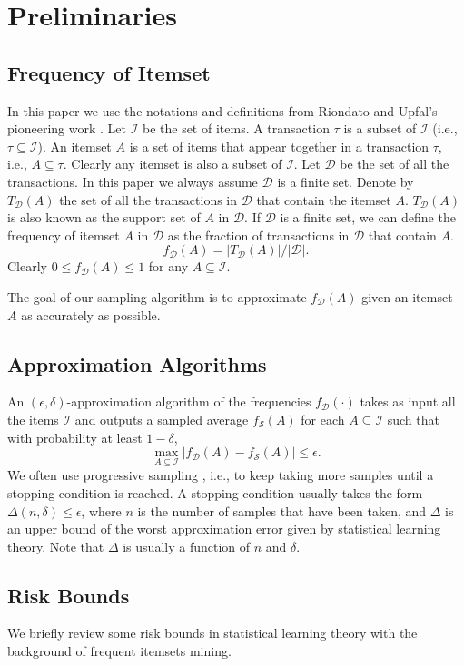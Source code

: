 \documentclass{article}
\begin{document}
\section{Preliminaries}
\subsection{Frequency of Itemset}
\newcommand{\I}{\mathcal{I}}
\newcommand{\D}{\mathcal{D}}
In this paper we use the notations and definitions from Riondato and Upfal's pioneering work \cite{RU15}. 
Let $\I$ be the set of items. A transaction $\tau$ is a subset of $\I$ (i.e., $\tau \subseteq \I$).
An itemset $A$ is a set of items that appear together in a transaction $\tau$, i.e., $A \subseteq \tau$. Clearly any itemset is also a subset of $\I$. 
Let $\D$ be the set of all the transactions. In this paper we always assume $\D$ is a finite set. Denote by $T_\D(A)$ the set of all the transactions in $\D$ that contain the itemset $A$. $T_\D(A)$ is also known as the support set of $A$ in $\D$.
If $\D$ is a finite set, we can define the frequency of itemset $A$ in $\D$ as the fraction of transactions in $\D$ that contain $A$.
$$f_\D(A) = |T_\D(A)|/|\D|.$$
Clearly $0 \leq f_\D(A) \leq 1$ for any $A \subseteq \I$.

The goal of our sampling algorithm is to approximate $f_\D(A)$ given an itemset $A$ as accurately as possible.

\subsection{Approximation Algorithms}
\newcommand{\Smp}{\mathcal{S}}
An $(\epsilon,\delta)$-approximation algorithm of the frequencies $f_\D(\cdot)$ takes as input all the items $\I$ and outputs a sampled average $f_\Smp(A)$ for each $A\subseteq\I$ such that with probability at least $1-\delta$,
$$\max_{A\subseteq\I}|f_\D(A) - f_\Smp(A)| \leq \epsilon.$$
We often use progressive sampling \cite{RU15,RU16}, i.e., to keep taking more samples until a stopping condition is reached. A stopping condition usually takes the form $\Delta(n, \delta) \leq \epsilon$, where $n$ is the number of samples that have been taken, and $\Delta$ is an upper bound of the worst approximation error given by statistical learning theory. Note that $\Delta$ is usually a function of $n$ and $\delta$.

\subsection{Risk Bounds}
\label{sec:rb}
\newcommand{\R}{\mathcal{R}}
We briefly review some risk bounds in statistical learning theory \cite{BBL05} with the background of frequent itemsets mining. 
\end{document}

